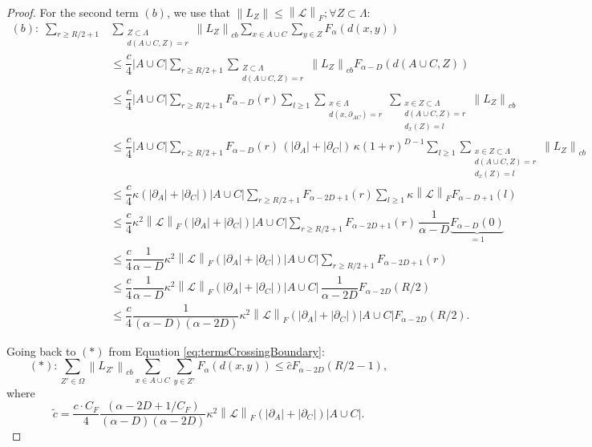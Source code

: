 \documentclass[10pt,a4paper]{amsart}
\newcommand{\La}{\Lambda}
\newcommand{\Li}{\mathcal{L}}
\newcommand{\abs}[1]{\left \vert#1\right\vert}
\newcommand{\norm}[1]{\left\lVert#1\right\rVert}
\newcommand{\normm}[2]{\left\lVert#1\right\rVert_{#2}}
\begin{document}
\begin{proof}
For the second term $(b)$, we use that $\norm{L_Z}\leq \normm{\Li}{F};\forall Z\subset \La $:
    \begin{align}
(b):\;\sum_{r\ge R/2+1}&\sum_{\substack{Z\subset \La \\ d(A\cup C,Z)= r}}\normm{L_{Z}}{cb}\sum_{x\in A\cup C}\sum_{y\in Z}F_\alpha(d(x,y))\\
&\le \dfrac{c}{4}\abs{A\cup C}\sum_{r\ge R/2+1}\sum_{\substack{Z\subset \La \\ d(A\cup C,Z)= r}}\normm{L_{Z}}{cb}F_{\alpha-D}(d(A\cup C,Z))
\nonumber\\
&\le \dfrac{c}{4}\abs{A\cup C}\sum_{r\ge R/2+1}F_{\alpha-D}(r)\sum_{l\ge 1}\sum_{\substack{x\in \La \\ d(x,\partial_{AC})= r}}\sum_{\substack{x\in Z\subset \La \\ d(A\cup C,Z)= r \\ d_x(Z)=l}}\normm{L_{Z}}{cb}
\nonumber\\
&\le \dfrac{c}{4}\abs{A\cup C}\sum_{r\ge R/2+1}F_{\alpha-D}(r)\,(\abs{\partial_{A}}+\abs{\partial_{C}})\,\kappa(1+r)^{D-1}\sum_{l\ge 1}\sum_{\substack{x\in Z\subset \La \\ d(A\cup C,Z)= r \\ d_x(Z)=l}}\normm{L_{Z}}{cb}
\nonumber\\
&\le \dfrac{c}{4}\kappa(\abs{\partial_{A}}+\abs{\partial_{C}})\abs{A\cup C}\sum_{r\ge R/2+1}F_{\alpha-2D+1}(r)\sum_{l\ge 1}\kappa \normm{\Li}{F}F_{\alpha-D+1}(l)
\nonumber\\
&\le \dfrac{c}{4}\kappa^2 \normm{\Li}{F}(\abs{\partial_{A}}+\abs{\partial_{C}})\abs{A\cup C}\sum_{r\ge R/2+1}F_{\alpha-2D+1}(r)\,\dfrac{1}{\alpha-D}\underbrace{F_{\alpha-D}(0)}_{=1}
\nonumber\\
&\le \dfrac{c}{4}\dfrac{1}{\alpha-D}\kappa^2 \normm{\Li}{F}(\abs{\partial_{A}}+\abs{\partial_{C}})\abs{A\cup C}\sum_{r\ge R/2+1}F_{\alpha-2D+1}(r)
\nonumber\\
&\le \dfrac{c}{4}\dfrac{1}{\alpha-D}\kappa^2 \normm{\Li}{F}(\abs{\partial_{A}}+\abs{\partial_{C}})\abs{A\cup C}\,\dfrac{1}{\alpha-2D}F_{\alpha-2D}(R/2)
\nonumber\\
&\le \dfrac{c}{4}\dfrac{1}{(\alpha-D)(\alpha-2D)}\kappa^2 \normm{\Li}{F}(\abs{\partial_{A}}+\abs{\partial_{C}})\abs{A\cup C}F_{\alpha-2D}(R/2).
\nonumber
\end{align}
    
    
    Going back to $(*)$ from Equation \eqref{eq:termsCrossingBoundary}:
    \begin{equation}
        (*):\sum_{Z'\in \Omega} \normm{L_{Z'}}{cb}\sum_{x\in A\cup C}\sum_{y\in Z'}F_\alpha(d(x,y))\leq \hat{c} F_{\alpha-2D}(R/2-1),
    \end{equation}
    where
    \begin{equation}
        \tilde{c}=\dfrac{c\cdot C_F}{4}\dfrac{(\alpha-2D +1/C_F)}{(\alpha-D )(\alpha-2D)}\kappa^2 \normm{\Li}{F} (\abs{\partial_{A}}+\abs{\partial_{C}})\abs{A\cup C}.
    \end{equation}


\end{proof}
\end{document}
